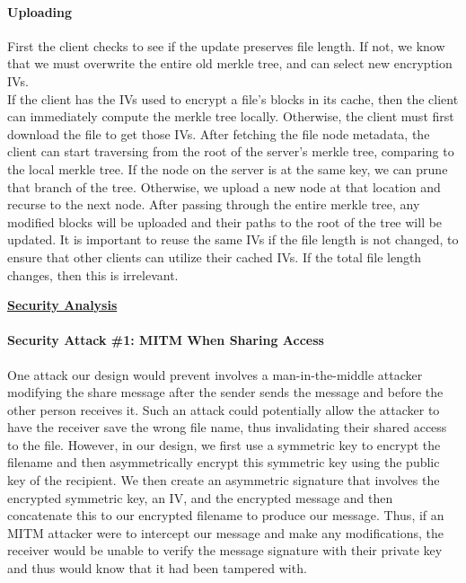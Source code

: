 \documentclass[12pt]{exam}
\begin{document}
\paragraph{Uploading}
First the client checks to see if the update preserves file length. If not, we know that we must overwrite the entire old merkle tree, and can select new encryption IVs.\\
If the client has the IVs used to encrypt a file's blocks in its cache, then the client can immediately compute the merkle tree locally. Otherwise, the client must first download the file to get those IVs. After fetching the file node metadata, the client can start traversing from the root of the server's merkle tree, comparing to the local merkle tree. If the node on the server is at the same key, we can prune that branch of the tree. Otherwise, we upload a new node at that location and recurse to the next node. After passing through the entire merkle tree, any modified blocks will be uploaded and their paths to the root of the tree will be updated. It is important to reuse the same IVs if the file length is not changed, to ensure that other clients can utilize their cached IVs. If the total file length changes, then this is irrelevant.

\large
\begin{center} \underline{\textbf{Security Analysis}} \end{center}

\normalsize

\paragraph{Security Attack \#1: MITM When Sharing Access} One attack our design would prevent involves a man-in-the-middle attacker modifying the share message after the sender sends the message and before the other person receives it. Such an attack could potentially allow the attacker to have the receiver save the wrong file name, thus invalidating their shared access to the file. However, in our design, we first use a symmetric key to encrypt the filename and then asymmetrically encrypt this symmetric key using the public key of the recipient. We then create an asymmetric signature that involves the encrypted symmetric key, an IV, and the encrypted message and then concatenate this to our encrypted filename to produce our message. Thus, if an MITM attacker were to intercept our message and make any modifications, the receiver would be unable to verify the message signature with their private key and thus would know that it had been tampered with.
\end{document}
